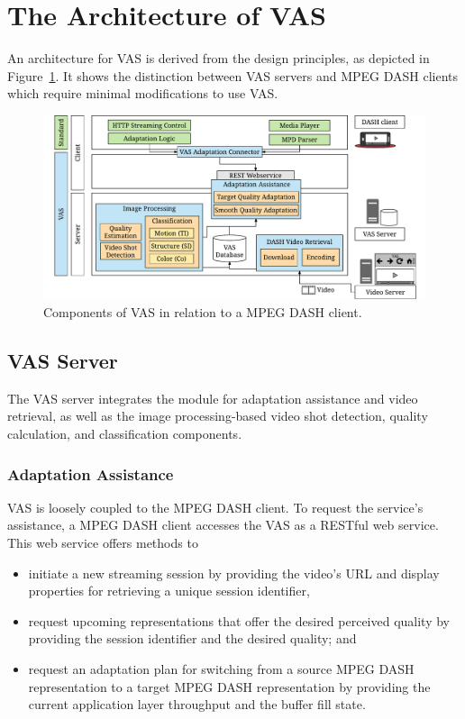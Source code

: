 \section{The Architecture of VAS}
\label{sec:721_architecture}
An architecture for \ac{VAS} is derived from the design principles, as depicted in Figure~\ref{fig:720_architecture}.
It shows the distinction between \ac{VAS} servers and \ac{MPEG} \ac{DASH} clients which require minimal modifications to use \ac{VAS}.
\begin{figure}[!htb]
\centering
\includegraphics[width=\linewidth]{./gfx/700_VAS/architecture.pdf}  
\caption{Components of  \ac{VAS} in relation to a \ac{MPEG} \ac{DASH} client.}
\label{fig:720_architecture}
\end{figure}
\subsection{VAS Server}
The \ac{VAS} server integrates the module for adaptation assistance and video retrieval, as well as the image processing-based video shot detection, quality calculation, and classification components.
\subsubsection{Adaptation Assistance}
\label{sec:721_overview_adaptation_assisstance}
\ac{VAS} is loosely coupled to the \ac{MPEG} \ac{DASH} client. 
To request the service's assistance, a \ac{MPEG} \ac{DASH} client accesses the \ac{VAS} as a \ac{REST}ful web service.
This web service offers methods to
\begin{itemize}
	\item initiate a new streaming session by providing the video's \ac{URL} and display properties for retrieving a unique session identifier,
	\item request upcoming representations that offer the desired perceived quality by providing the session identifier and the desired quality; and
	\item request an adaptation plan for switching from a source \ac{MPEG} \ac{DASH} representation to a target \ac{MPEG} \ac{DASH} representation by providing the current application layer throughput and the buffer fill state.
\end{itemize}

